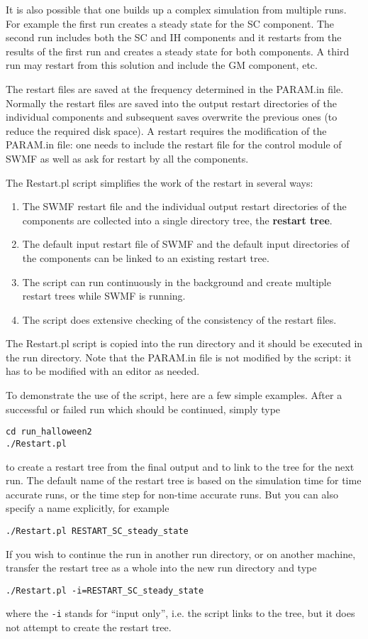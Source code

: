 It is also possible that one builds up a complex simulation from multiple 
runs. For example the first run creates a steady state for the SC component.
The second run includes both the SC and IH components and it 
restarts from the results of the first run and creates a steady state
for both components. A third run may restart from this solution and include
the GM component, etc. 

The restart files are saved at the frequency determined in the PARAM.in file.
Normally the restart files are saved into the output restart directories
of the individual components and subsequent saves overwrite the previous ones
(to reduce the required disk space). A restart requires the modification
of the PARAM.in file: one needs to include the restart file for the
control module of SWMF as well as ask for restart by all the components.

The Restart.pl script simplifies the work of the restart in several ways:
\begin{enumerate}
\item The SWMF restart file and the individual output restart 
directories of the components are collected into a single directory tree, 
the {\bf restart tree}.
\item The default input restart file of SWMF and the default 
      input directories of the components can be linked to an existing
      restart tree.
\item The script can run continuously in the background and create
      multiple restart trees while SWMF is running. 
\item The script does extensive checking of the consistency 
      of the restart files.
\end{enumerate}
The Restart.pl script is copied into the run directory and it should
be executed in the run directory. Note that the PARAM.in file is not
modified by the script: it has to be modified with an editor as needed.

To demonstrate the use of the script, here are a few simple examples.
After a successful or failed run which should be continued, simply type
\begin{verbatim}
cd run_halloween2
./Restart.pl
\end{verbatim}
to create a restart tree from the final output and to link to the tree for the
next run. The default name of the restart tree is based on the simulation time
for time accurate runs, or the time step for non-time accurate runs.
But you can also specify a name explicitly, for example
\begin{verbatim}
./Restart.pl RESTART_SC_steady_state
\end{verbatim}
If you wish to continue the run in another run directory, or on another
machine, transfer the restart tree as a whole into the new run
directory and type
\begin{verbatim}
./Restart.pl -i=RESTART_SC_steady_state
\end{verbatim}
where the {\tt -i} stands for ``input only'', i.e. the script links to
the tree, but it does not attempt to create the restart tree.

